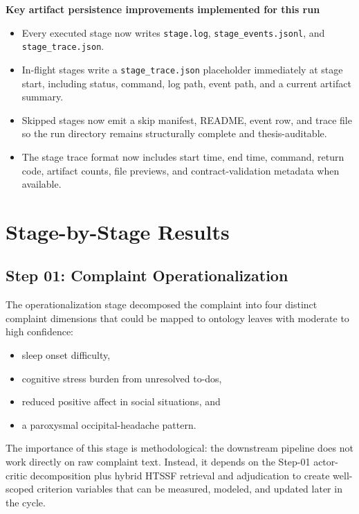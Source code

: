 \documentclass[11pt,a4paper]{article}
\begin{document}
\begin{tcolorbox}[
  colback=PhoenixSoft,
  colframe=PhoenixBorder,
  boxrule=0.6pt,
  arc=1.2mm
]
\textbf{Key artifact persistence improvements implemented for this run}
\begin{itemize}
\item Every executed stage now writes \texttt{stage.log}, \texttt{stage\_events.jsonl}, and \texttt{stage\_trace.json}.
\item In-flight stages write a \texttt{stage\_trace.json} placeholder immediately at stage start, including status, command, log path, event path, and a current artifact summary.
\item Skipped stages now emit a skip manifest, README, event row, and trace file so the run directory remains structurally complete and thesis-auditable.
\item The stage trace format now includes start time, end time, command, return code, artifact counts, file previews, and contract-validation metadata when available.
\end{itemize}
\end{tcolorbox}

\section{Stage-by-Stage Results}

\subsection{Step 01: Complaint Operationalization}
The operationalization stage decomposed the complaint into four distinct complaint dimensions that could be mapped to ontology leaves with moderate to high confidence:
\begin{itemize}
\item sleep onset difficulty,
\item cognitive stress burden from unresolved to-dos,
\item reduced positive affect in social situations, and
\item a paroxysmal occipital-headache pattern.
\end{itemize}

The importance of this stage is methodological: the downstream pipeline does not work directly on raw complaint text. Instead, it depends on the Step-01 actor-critic decomposition plus hybrid HTSSF retrieval and adjudication to create well-scoped criterion variables that can be measured, modeled, and updated later in the cycle.
\end{document}
